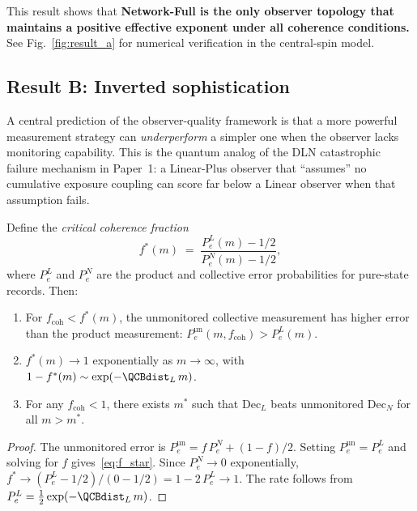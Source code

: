 This result shows that \textbf{Network-Full is the only observer topology
that maintains a positive effective exponent under all coherence conditions.}
See Fig.~\ref{fig:result_a} for numerical verification in the central-spin model.



\subsection{Result B: Inverted sophistication}
\label{sec:result_b}

A central prediction of the observer-quality framework is that a more
powerful measurement strategy can \emph{underperform} a simpler one when
the observer lacks monitoring capability.  This is the quantum analog of the
DLN catastrophic failure mechanism in Paper~1: a Linear-Plus observer that
``assumes'' no cumulative exposure coupling can score far below a Linear
observer when that assumption fails.

\begin{proposition}
\label{prop:inverted}
Define the \emph{critical coherence fraction}
\begin{equation}
\label{eq:f_star}
  f^*(m) \;=\; \frac{P_e^L(m) - 1/2}{P_e^N(m) - 1/2},
\end{equation}
where $P_e^L$ and $P_e^N$ are the product and collective error probabilities
for pure-state records.  Then:
\begin{enumerate}[nosep,label=(\alph*)]
  \item For $f_{\mathrm{coh}} < f^*(m)$, the unmonitored collective
    measurement has higher error than the product measurement:
    $P_e^{\mathrm{un}}(m,f_{\mathrm{coh}}) > P_e^L(m)$.
  \item $f^*(m) \to 1$ exponentially as $m \to \infty$, with
    $1 - f^*(m) \sim \exp(-\QCBdist_L\,m)$.
  \item For any $f_{\mathrm{coh}} < 1$, there exists $m^*$ such that
    Dec$_L$ beats unmonitored Dec$_N$ for all $m > m^*$.
\end{enumerate}
\end{proposition}

\begin{proof}
The unmonitored error is $P_e^{\mathrm{un}} = f\,P_e^N + (1-f)/2$.  Setting
$P_e^{\mathrm{un}} = P_e^L$ and solving for $f$ gives~\eqref{eq:f_star}.
Since $P_e^N \to 0$ exponentially, $f^* \to (P_e^L - 1/2)/(0 - 1/2)
= 1 - 2\,P_e^L \to 1$.  The rate follows from
$P_e^L = \tfrac{1}{2}\exp(-\QCBdist_L\,m)$.
\end{proof}

